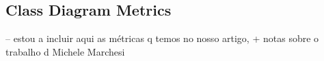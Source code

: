\subsection{Class Diagram Metrics}

-- estou a incluir aqui as métricas q temos no nosso artigo, + notas sobre o trabalho d Michele Marchesi
